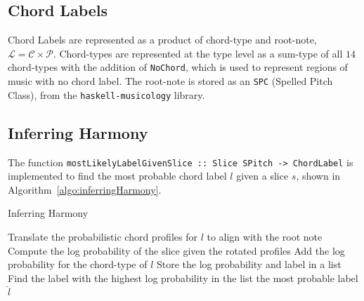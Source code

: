 \documentclass[12pt,a4paper,twoside,openany]{report} \usepackage[pdfborder={0 0 0}]{hyperref}    %
\theoremstyle{definition} \newtheorem{definition}{Definition}[section]
\begin{document}
    \subsection{Chord Labels}

    Chord Labels are represented as a product of chord-type and root-note, $\mathcal{L} = \mathcal{C} \times
    \mathcal{P}$. Chord-types are represented at the type level as a sum-type of all $14$ chord-types with the
    addition of \texttt{NoChord}, which is used to represent regions of music with no chord label. 
    The root-note is stored as an \texttt{SPC} (Spelled Pitch Class), from the
    \texttt{haskell-musicology} library.
    
%

    \subsection{Inferring Harmony}

    The function \texttt{mostLikelyLabelGivenSlice :: Slice SPitch -> ChordLabel} is implemented to find the most probable
    chord label $l$ given a slice $s$, shown in Algorithm~\ref{algo:inferringHarmony}. 

    \begin{algorithm}[H]
    \caption{Inferring Harmony}
    \label{algo:inferringHarmony}
    \begin{algorithmic}[1]
    \State Translate the probabilistic chord profiles for $l$ to align with the root note
    \State Compute the log probability of the slice given the rotated profiles
    \State Add the log probability for the chord-type of $l$
    \State Store the log probability and label in a list
    \EndFor
    \State Find the label with the highest log probability in the list
    \State \Return the most probable label $\hat{l}$
    \end{algorithmic}
    \end{algorithm}
\end{document}
